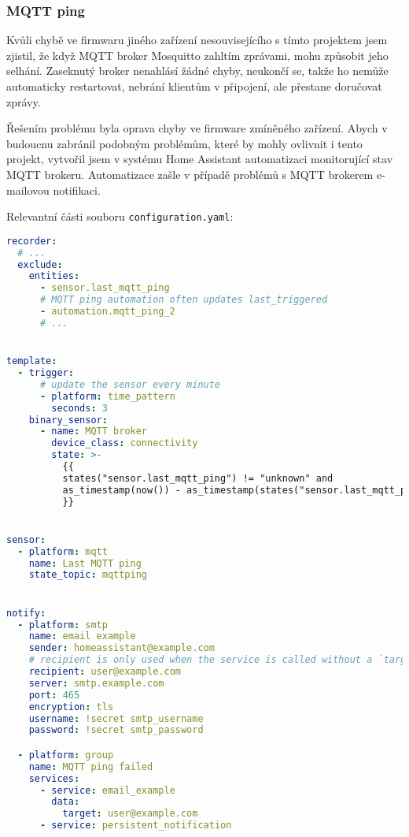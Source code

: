 \subsubsection{MQTT ping}  %
Kvůli chybě ve firmwaru jiného zařízení nesouvisejícího s tímto projektem jsem
zjistil, že když MQTT broker Mosquitto zahltím zprávami, mohu způsobit jeho
selhání. Zaseknutý broker nenahlásí žádné chyby, neukončí se, takže ho
 nemůže automaticky restartovat, nebrání klientům
v připojení, ale přestane doručovat zprávy.

Řešením problému byla oprava chyby ve firmware zmíněného zařízení. Abych
v budoucnu zabránil podobným problémům, které by mohly ovlivnit i tento
projekt, vytvořil jsem v systému Home Assistant automatizaci monitorující stav
MQTT brokeru. Automatizace zašle v případě problémů s MQTT brokerem e-mailovou
notifikaci.

Relevantní části souboru \texttt{configuration.yaml}:
\begin{lstlisting}[language=yaml]
recorder:
  # ...
  exclude:
    entities:
      - sensor.last_mqtt_ping
      # MQTT ping automation often updates last_triggered
      - automation.mqtt_ping_2
      # ...


template:
  - trigger:
      # update the sensor every minute
      - platform: time_pattern
        seconds: 3
    binary_sensor:
      - name: MQTT broker
        device_class: connectivity
        state: >-
          {{
          states("sensor.last_mqtt_ping") != "unknown" and
          as_timestamp(now()) - as_timestamp(states("sensor.last_mqtt_ping")) < 620
          }}


sensor:
  - platform: mqtt
    name: Last MQTT ping
    state_topic: mqttping


notify:
  - platform: smtp
    name: email example
    sender: homeassistant@example.com
    # recipient is only used when the service is called without a `target`
    recipient: user@example.com
    server: smtp.example.com
    port: 465
    encryption: tls
    username: !secret smtp_username
    password: !secret smtp_password

  - platform: group
    name: MQTT ping failed
    services:
      - service: email_example
        data:
          target: user@example.com
      - service: persistent_notification
\end{lstlisting}


